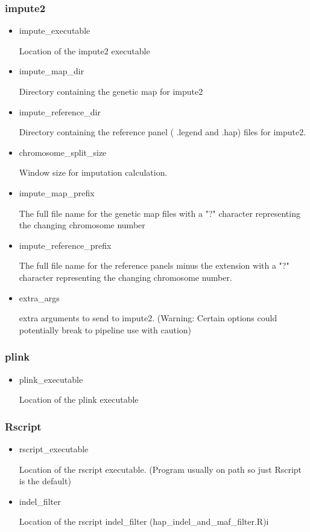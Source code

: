 \subsubsection{impute2}
\begin{itemize}
\item impute\_executable 

Location of the impute2 executable
\item impute\_map\_dir

Directory containing the genetic map for impute2
\item impute\_reference\_dir 

Directory containing the reference panel ( .legend and .hap) files for impute2.
\item chromosome\_split\_size

Window size for imputation calculation.
\item impute\_map\_prefix

The full file name for the genetic map files with a "?" character representing the changing chromosome number
\item impute\_reference\_prefix

The full file name for the reference panels minus the extension with a "?" character representing the changing chromosome number.
\item extra\_args

 extra arguments to send to impute2. (Warning: Certain options could potentially break to pipeline use with caution)
\end{itemize}
\subsubsection{plink}
\begin{itemize}
\item plink\_executable 

Location of the plink executable
\end{itemize}
\subsubsection{Rscript}
\begin{itemize}
\item rscript\_executable

Location of the rscript executable. (Program usually on path so just Rscript is the default)
\item indel\_filter

Location of the rscript indel\_filter (hap\_indel\_and\_maf\_filter.R)i
\end{itemize}
